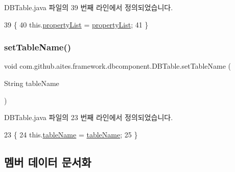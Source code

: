 D\+B\+Table.\+java 파일의 39 번째 라인에서 정의되었습니다.


\begin{DoxyCode}
39                                                                 \{
40         this.\mbox{\hyperlink{classcom_1_1github_1_1aites_1_1framework_1_1dbcomponent_1_1_d_b_table_aaa1e58925c9f05a3cdc868defed1e0de}{propertyList}} = \mbox{\hyperlink{classcom_1_1github_1_1aites_1_1framework_1_1dbcomponent_1_1_d_b_table_aaa1e58925c9f05a3cdc868defed1e0de}{propertyList}};
41     \}
\end{DoxyCode}
\mbox{\label{classcom_1_1github_1_1aites_1_1framework_1_1dbcomponent_1_1_d_b_table_a951e8bb16dbac614cede59e99e93aaeb}} 
\subsubsection{\texorpdfstring{set\+Table\+Name()}{setTableName()}}
{\footnotesize\ttfamily void com.\+github.\+aites.\+framework.\+dbcomponent.\+D\+B\+Table.\+set\+Table\+Name (\begin{DoxyParamCaption}\item[{String}]{table\+Name }\end{DoxyParamCaption})}



D\+B\+Table.\+java 파일의 23 번째 라인에서 정의되었습니다.


\begin{DoxyCode}
23                                               \{
24         this.\mbox{\hyperlink{classcom_1_1github_1_1aites_1_1framework_1_1dbcomponent_1_1_d_b_table_a13baee6ab61eeea3b604d2a7b99b11e7}{tableName}} = \mbox{\hyperlink{classcom_1_1github_1_1aites_1_1framework_1_1dbcomponent_1_1_d_b_table_a13baee6ab61eeea3b604d2a7b99b11e7}{tableName}};
25     \}
\end{DoxyCode}


\subsection{멤버 데이터 문서화}
\mbox{\label{classcom_1_1github_1_1aites_1_1framework_1_1dbcomponent_1_1_d_b_table_ae3a224a5b6fc20939a74e36127103bcc}} 
